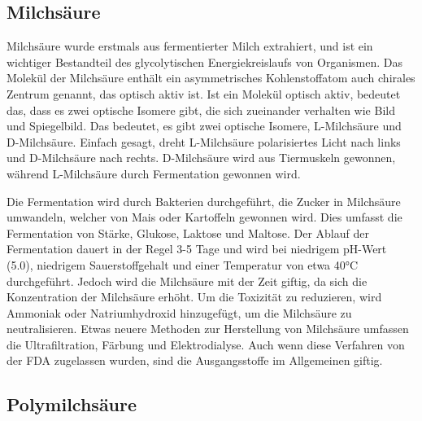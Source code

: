 \documentclass[10pt]{article}
\begin{document}
    \subsection{Milchsäure}
    Milchsäure wurde erstmals aus fermentierter Milch extrahiert, und ist ein wichtiger Bestandteil des glycolytischen Energiekreislaufs von Organismen.
    Das Molekül der Milchsäure enthält ein asymmetrisches Kohlenstoffatom auch chirales Zentrum genannt, das optisch aktiv ist.
    Ist ein Molekül optisch aktiv, bedeutet das, dass es zwei optische Isomere gibt, die sich zueinander verhalten wie Bild und Spiegelbild.
    Das bedeutet, es gibt zwei optische Isomere, L-Milchsäure und D-Milchsäure.
    Einfach gesagt, dreht L-Milchsäure polarisiertes Licht nach links und D-Milchsäure nach rechts.
    D-Milchsäure wird aus Tiermuskeln gewonnen, während L-Milchsäure durch Fermentation gewonnen wird.

    \begin{figure}[H]
        \centering
        \qquad
    \end{figure}

    Die Fermentation wird durch Bakterien durchgeführt, die Zucker in Milchsäure umwandeln, welcher von Mais oder Kartoffeln gewonnen wird.
    Dies umfasst die Fermentation von Stärke, Glukose, Laktose und Maltose.
    Der Ablauf der Fermentation dauert in der Regel 3-5 Tage und wird bei niedrigem pH-Wert (5.0), niedrigem Sauerstoffgehalt und einer Temperatur von etwa 40°C durchgeführt.
    Jedoch wird die Milchsäure mit der Zeit giftig, da sich die Konzentration der Milchsäure erhöht.
    Um die Toxizität zu reduzieren, wird Ammoniak oder Natriumhydroxid hinzugefügt, um die Milchsäure zu neutralisieren.
    Etwas neuere Methoden zur Herstellung von Milchsäure umfassen die Ultrafiltration, Färbung und Elektrodialyse.
    Auch wenn diese Verfahren von der FDA zugelassen wurden, sind die Ausgangsstoffe im Allgemeinen giftig.

    \subsection{Polymilchsäure}
\end{document}
